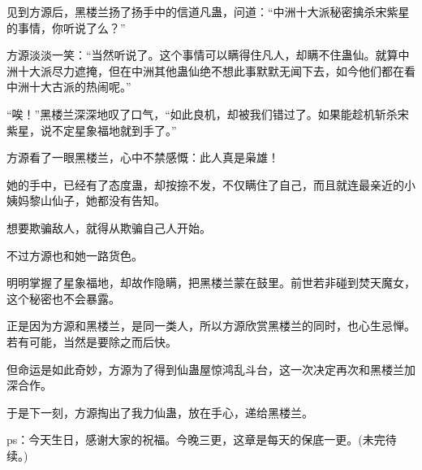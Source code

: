 \begin{this_body}
见到方源后，黑楼兰扬了扬手中的信道凡蛊，问道：“中洲十大派秘密擒杀宋紫星的事情，你听说了么？”

方源淡淡一笑：“当然听说了。这个事情可以瞒得住凡人，却瞒不住蛊仙。就算中洲十大派尽力遮掩，但在中洲其他蛊仙绝不想此事默默无闻下去，如今他们都在看中洲十大古派的热闹呢。”

“唉！”黑楼兰深深地叹了口气，“如此良机，却被我们错过了。如果能趁机斩杀宋紫星，说不定星象福地就到手了。”

方源看了一眼黑楼兰，心中不禁感慨：此人真是枭雄！

她的手中，已经有了态度蛊，却按捺不发，不仅瞒住了自己，而且就连最亲近的小姨妈黎山仙子，她都没有告知。

想要欺骗敌人，就得从欺骗自己人开始。

不过方源也和她一路货色。

明明掌握了星象福地，却故作隐瞒，把黑楼兰蒙在鼓里。前世若非碰到焚天魔女，这个秘密也不会暴露。

正是因为方源和黑楼兰，是同一类人，所以方源欣赏黑楼兰的同时，也心生忌惮。若有可能，当然是要除之而后快。

但命运是如此奇妙，方源为了得到仙蛊屋惊鸿乱斗台，这一次决定再次和黑楼兰加深合作。

于是下一刻，方源掏出了我力仙蛊，放在手心，递给黑楼兰。

ps：今天生日，感谢大家的祝福。今晚三更，这章是每天的保底一更。(未完待续。)

\end{this_body}

